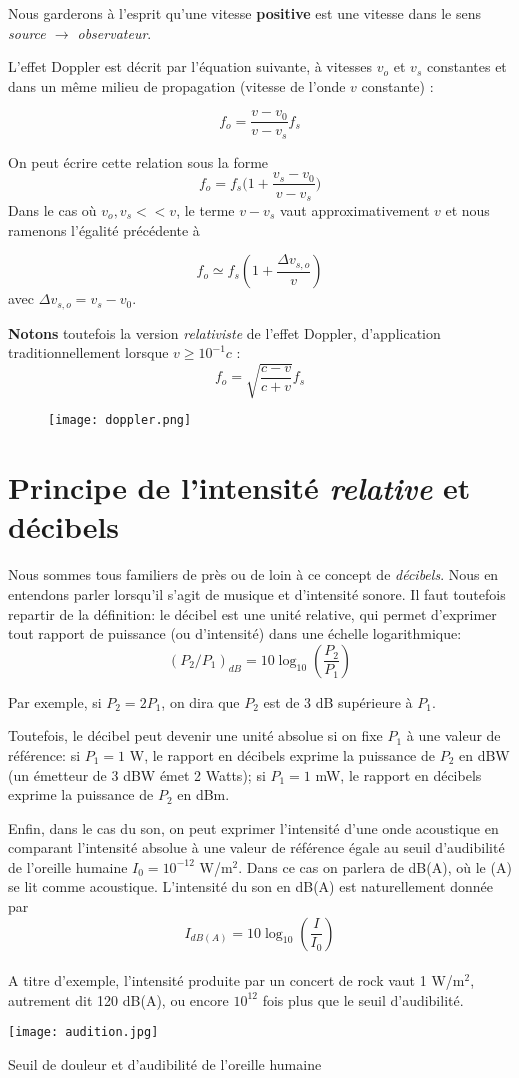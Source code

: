 Nous garderons à l'esprit qu'une vitesse \textbf{positive} est une vitesse dans le sens \textit{source $\rightarrow$ observateur}.

L'effet Doppler est décrit par l'équation suivante, à vitesses $v_{o}$ et $v_{s}$ constantes et dans un même milieu de propagation (vitesse de l'onde $v$ constante) : 

\[f_{o} = \frac{v-v_{0}}{v-v_{s}}f_{s}\]

On peut écrire cette relation sous la forme
$$ f_{o} = f_s\Big(1+\frac{v_s-v_{0}}{v-v_{s}}\Big)$$
Dans le cas où $v_{o},v_{s} << v$, le terme $v-v_s$ vaut approximativement $v$ et nous ramenons l'égalité précédente à 

\[f_{o} \simeq f_{s} (1 + \frac{\Delta v_{s,o}}{v}) \]
avec $\Delta v_{s,o}=v_s-v_0$.

\textbf{Notons} toutefois la version \textit{relativiste} de l'effet Doppler, d'application traditionnellement lorsque $v \geq 10^{-1} c$ : 
\[  f_{o} = \sqrt{\frac{c-v}{c + v}} f_{s}\]

\begin{figure*}
	\texttt{[image: doppler.png]}
\end{figure*}

\section{Principe de l'intensité \textit{relative} et décibels} 

Nous sommes tous familiers de près ou de loin à ce concept de \textit{décibels}. Nous en entendons parler lorsqu'il s'agit de musique et d'intensité sonore. Il faut toutefois repartir de la définition: le décibel est une unité relative, qui permet d'exprimer tout rapport de puissance (ou d'intensité) dans une échelle logarithmique:
\[ (P_2/P_1)_{dB} = 10 \log_{10}(\frac{P_2}{P_1}) \]

Par exemple, si $P_2 = 2P_1$, on dira que $P_2$ est de 3 dB supérieure à $P_1$. 

Toutefois, le décibel peut devenir une unité absolue si on fixe $P_1$ à une valeur de référence: si $P_1 = 1$ W, le rapport en décibels exprime la puissance de $P_2$ en dBW (un émetteur de 3 dBW émet 2 Watts); si $P_1 = 1$ mW, le rapport en décibels exprime la puissance de $P_2$ en dBm. 

Enfin, dans le cas du son, on peut exprimer l'intensité d'une onde acoustique en comparant l'intensité absolue à une valeur de référence égale au seuil d'audibilité de l'oreille humaine $I_0 = 10^{-12}$ W/m$^2$. Dans ce cas on parlera de dB(A), où le (A) se lit comme acoustique. L'intensité du son en dB(A) est naturellement donnée par 
\[ I_{dB(A)} = 10 \log_{10}(\frac{I}{I_{0}}) \]
\\ 
A titre d'exemple, l'intensité produite par un concert de rock vaut 1 W/m$^2$, autrement dit 120 dB(A), ou encore $10^{12}$ fois plus que le seuil d'audibilité. 
\begin{marginfigure}[-5cm]
	\texttt{[image: audition.jpg]}
	\caption{Seuil de douleur et d'audibilité de l'oreille humaine}
\end{marginfigure}

